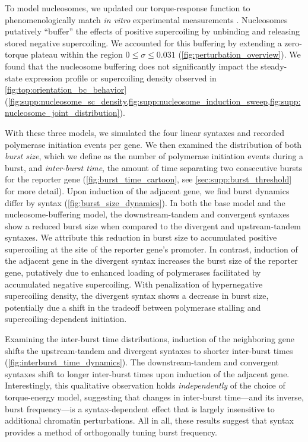 \documentclass[11pt]{article}
\begin{document}
To model nucleosomes, we updated our torque-response function to phenomenologically match \textit{in vitro} experimental measurements \parencite{leSynergisticCoordinationChromatin2019}. Nucleosomes putatively ``buffer'' the effects of positive supercoiling by unbinding and releasing stored negative supercoiling. We accounted for this buffering by extending a zero-torque plateau within the region \(0 \leq \sigma \leq 0.031\) (\cref{fig:perturbation_overview}). We found that the nucleosome buffering does not significantly impact the steady-state expression profile or supercoiling density observed in \cref{fig:top:orientation_bc_behavior} (\cref{fig:supp:nucleosome_sc_density,fig:supp:nucleosome_induction_sweep,fig:supp:nucleosome_joint_distribution}).


With these three models, we simulated the four linear syntaxes and recorded polymerase initiation events per gene. We then examined the distribution of both \emph{burst size}, which we define as the number of polymerase initiation events during a burst, and \emph{inter-burst time}, the amount of time separating two consecutive bursts for the reporter gene (\cref{fig:burst_time_cartoon}, see \cref{sec:supp:burst_threshold} for more detail). Upon induction of the adjacent gene, we find burst dynamics differ by syntax (\cref{fig:burst_size_dynamics}). In both the base model and the nucleosome-buffering model, the downstream-tandem and convergent syntaxes show a reduced burst size when compared to the divergent and upstream-tandem syntaxes. We attribute this reduction in burst size to accumulated positive supercoiling at the site of the reporter gene's promoter. In contrast, induction of the adjacent gene in the divergent syntax increases the burst size of the reporter gene, putatively due to enhanced loading of polymerases facilitated by accumulated negative supercoiling. With penalization of hypernegative supercoiling density, the divergent syntax shows a decrease in burst size, potentially due a shift in the tradeoff between polymerase stalling and supercoiling-dependent initiation. 

Examining the inter-burst time distributions, induction of the neighboring gene shifts the upstream-tandem and divergent syntaxes to shorter inter-burst times (\cref{fig:interburst_time_dynamics}).  The downstream-tandem and convergent syntaxes shift to longer inter-burst times upon induction of the adjacent gene. Interestingly, this qualitative observation holds \emph{independently} of the choice of torque-energy model, suggesting that changes in inter-burst time---and its inverse, burst frequency---is a syntax-dependent effect that is largely insensitive to additional chromatin perturbations. All in all, these results suggest that syntax provides a method of orthogonally tuning burst frequency.
\end{document}
